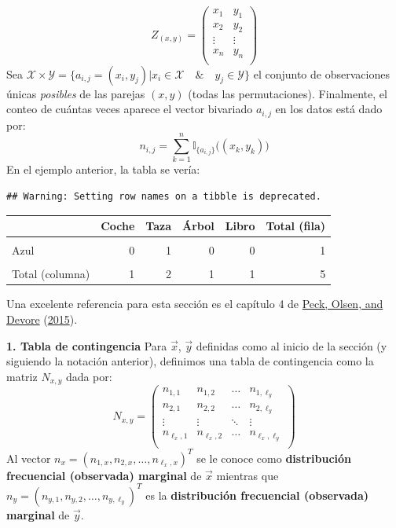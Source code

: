 \documentclass[
]{book}
\begin{document}
\[
Z_{(x,y)} = 
\begin{pmatrix}
x_1 & y_1 \\
x_2 & y_2 \\
\vdots & \vdots \\
x_n & y_n \\
\end{pmatrix}
\]
Sea \(\mathcal{X}\times\mathcal{Y} = \{ a_{i,j} = (x_i,y_j) | x_i \in \mathcal{X} \quad \& \quad y_j \in \mathcal{Y}\}\) el conjunto de observaciones únicas \emph{posibles} de las parejas \((x,y)\) (todas las permutaciones). Finalmente, el conteo de cuántas veces aparece el vector bivariado \(a_{i,j}\) en los datos está dado por:
\[
n_{i,j} = \sum\limits_{k = 1}^{n}  \mathbb{I}_{\{ a_{i,j} \}}\big( (x_k, y_k) \big)
\]
En el ejemplo anterior, la tabla se vería:

\begin{verbatim}
## Warning: Setting row names on a tibble is deprecated.
\end{verbatim}

\begin{table}
\centering
\begin{tabular}{l|r|r|r|r|r}
\hline
  & Coche & Taza & Árbol & Libro & Total (fila)\\
\hline
\cellcolor{gray!6}{Rojo} & \cellcolor{gray!6}{1} & \cellcolor{gray!6}{1} & \cellcolor{gray!6}{0} & \cellcolor{gray!6}{0} & \cellcolor{gray!6}{2}\\
\hline
Azul & 0 & 1 & 0 & 0 & 1\\
\hline
\cellcolor{gray!6}{Verde} & \cellcolor{gray!6}{0} & \cellcolor{gray!6}{0} & \cellcolor{gray!6}{1} & \cellcolor{gray!6}{1} & \cellcolor{gray!6}{2}\\
\hline
Total (columna) & 1 & 2 & 1 & 1 & 5\\
\hline
\end{tabular}
\end{table}

Una excelente referencia para esta sección es el capítulo 4 de \protect\hyperlink{ref-peck2015introduction}{Peck, Olsen, and Devore} (\protect\hyperlink{ref-peck2015introduction}{2015}).

\textbf{1. Tabla de contingencia }
Para \(\vec{x}\), \(\vec{y}\) definidas como al inicio de la sección (y siguiendo la notación anterior), definimos una tabla de contingencia como la matriz \(N_{x,y}\) dada por:
\[
N_{x,y} = \begin{pmatrix}
n_{1,1} & n_{1,2} & \dots & n_{1, \ell_y} \\
n_{2,1} & n_{2,2} & \dots & n_{2, \ell_y} \\
\vdots  & \vdots  & \ddots & \vdots \\
n_{\ell_x,1} & n_{\ell_x,2} & \dots & n_{\ell_x, \ell_y} \\
\end{pmatrix}
\]
Al vector \(n_x = (n_{1,x}, n_{2,x}, \dots, n_{\ell_x,x})^T\) se le conoce como \textbf{distribución frecuencial (observada) marginal} de \(\vec{x}\) mientras que \(n_y = (n_{y,1}, n_{y,2}, \dots, n_{y,\ell_y})^T\) es la \textbf{distribución frecuencial (observada) marginal} de \(\vec{y}\).
\end{document}
